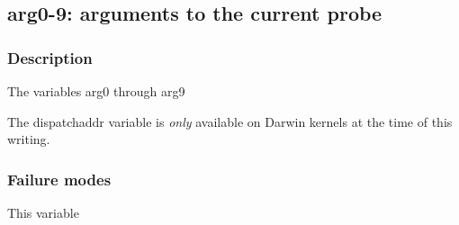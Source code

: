 \clearpage
{}
{}
\label{vars:arg09}
\subsection*{arg0-9: arguments to the current probe}

\subsubsection*{Description}

The variables arg0 through arg9

The dispatchaddr variable is \emph{only} available on Darwin kernels
at the time of this writing.

\subsubsection*{Failure modes}

This variable
